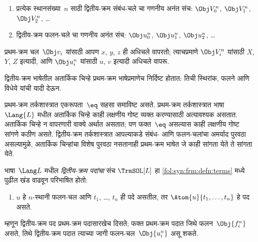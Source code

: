 \begin{enumerate}
\item प्रत्येक
  स्थानसंख्या~$n$
  साठी द्वितीय-क्रम
  संबंध-चले
  चा गणनीय अनंत
  संच:
  $\Obj V_0^n$, $\Obj V_1^n$, $\Obj V_2^n$, \dots
\item द्वितीय-क्रम
  फलन-चले
  चा गणनीय अनंत
  संच:
  $\Obj u_0^n$, $\Obj u_1^n$, $\Obj u_2^n$, \dots
\end{enumerate}

प्रथम-क्रम
चल~$\Obj v_i$
यांसाठी आपण
$x$, $y$, $z$
ही अधिचले
वापरतो; त्याचप्रमाणे
$\Obj V_i^n$
यांसाठी
$X$, $Y$, $Z$
इत्यादी, आणि
$\Obj u_i^n$
यांसाठी
$u$, $v$
इत्यादी अधिचले
वापरू.

\begin{explain}
द्वितीय-क्रम
भाषेतील अतार्किक
चिन्हे प्रथम-क्रम
भाषेप्रमाणेच
निर्दिष्ट होतात:
तिची स्थिरांक,
फलने
आणि विधेये
यांची यादी देऊन.

प्रथम-क्रम
तर्कशास्त्रात
एकरूपता~$\eq$
सहसा समाविष्ट
असते.
प्रथम-क्रम
तर्कशास्त्रात
भाषा~$\Lang{L}$
मधील अतार्किक
चिन्हे काही
लक्षणीय गोष्ट
व्यक्त करण्यासाठी
अत्यावश्यक असतात.
अतार्किक चिन्हे
न वापरणारी
वाक्ये
अर्थात असतात;
पण फक्त~$\eq$
असल्यास काही
लक्षणीय गोष्ट
सांगणे कठीण
असते.
द्वितीय-क्रम
तर्कशास्त्रात
आपल्याकडे संबंध-
आणि फलन-चलांचा
अमर्याद पुरवठा
असल्यामुळे,
अतार्किक चिन्हांचा
विशेष पुरवठा
नसतानाही
प्रथम-क्रम
भाषेत जे काही
सांगता येते
ते सांगता येते.
\end{explain}

\begin{defn}[द्वितीय-क्रम पदे]
भाषा~$\Lang L$
मधील \emph{द्वितीय-क्रम
पदांचा} संच
$\TrmSOL[L]$
हा \ref{fol:syn:frm:defn:terms}
मध्ये पुढील
खंड वाढवून
परिभाषित होतो:
\begin{enumerate}
\item $u$ हे
  $n$-स्थानी
  फलन-चल
  आणि $t_1$,
  \dots, $t_n$
  ही पदे असतील,
  तर $\Atom{u}{t_1, \ldots, t_n}$
  हे पद असते.
\end{enumerate}
\end{defn}

\begin{explain}
म्हणून द्वितीय-क्रम
पद प्रथम-क्रम
पदासारखेच दिसते;
फक्त प्रथम-क्रम
पदात जिथे
फलन~$\Obj{f^n_i}$
असते, तिथे
द्वितीय-क्रम
पदात त्याच्या
जागी फलन-चल~$\Obj{u^n_i}$
असू शकते.
\end{explain}

